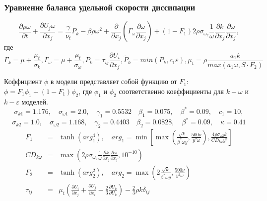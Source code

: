 \documentclass[pdftex,a4paper,12pt]{article}
\begin{document}
		\subsubsection{Уравнение баланса удельной скорости диссипации}
			\begin{equation}
				\frac{\partial \rho \omega}{\partial t} + \frac{\partial U_j \omega}{\partial x_j} = \frac{\gamma}{\nu_t}P_k - \beta\rho\omega^2 + \frac{\partial}{\partial x_j}(\Gamma_{\omega}\frac{\partial \omega}{\partial x_j}) + (1-F_1)2\rho \sigma_{\omega_2}\frac{1}{\omega}\frac{\partial k}{\partial x_j}\frac{\partial \omega}{\partial x_j},
			\end{equation}
			где
			\small{
			\begin{equation}
				\Gamma_k = \mu + \frac{\mu_t}{\sigma_k}, \Gamma_{\omega} = \mu + \frac{\mu_t}{\sigma_{\omega}}, P_k = \tau_{ij}\frac{\partial U_i}{\partial x_j}, \tilde{P}_k = min(P_k, c_1\varepsilon), \mu_t=\rho\frac{a_1 k}{max(a_1\omega, S \cdot F_2)}
			\end{equation}
			}
			
			Коффициент $\phi$ в модели представляет собой функцию от $F_1$: $\phi = F_1\phi_1 + (1-F_1)\phi_2$, где $\phi_1$ и $\phi_2$ соответственно коеффициенты для $k-\omega$ и $k-\varepsilon$ моделей.
			$$
				\sigma_{k1} = 1.176, \quad \sigma_{\omega 1} = 2.0, \quad \gamma_1 = 0.5532 \quad \beta_1=0.075, \quad \beta^*=0.09, \quad c_1 = 10,
			$$
			$$
				\sigma_{k2} = 1.0, \quad \sigma_{\omega 2} = 1.168, \quad \gamma_2 = 0.4403 \quad \beta_2=0.0828, \quad \beta^*=0.09, \quad \kappa = 0.41
			$$
			\begin{eqnarray}
				F_1 &=& \tanh{(arg_1^4)}, \quad arg_1 = \min\left[\max\left(\frac{\sqrt{k}}{\beta^*\omega y},\frac{500 \nu}{y^2 \omega} \right), \frac{4\rho\sigma_{\omega 2}k}{CD_{k\omega}y^2}\right] \\ \nonumber CD_{k\omega} &=& \max\left( 2\rho\sigma_{\omega_2}\frac{1}{\omega}\frac{\partial k}{\partial x_j}\frac{\partial \omega}{\partial x_j},10^{-10} \right) \\
				F_2 &=& \tanh{(arg_2^2)}, \quad arg_2 = \max\left(2\frac{\sqrt{k}}{\beta^*\omega y},\frac{500 \nu}{y^2\omega}\right) \\
				\nonumber \tau_{ij} &=& \mu_t\left( \frac{\partial U_i}{\partial x_j} + \frac{\partial U_j}{\partial x_i} - \frac{2}{3}\frac{\partial U_k}{\partial U_k}\right) - \frac{2}{3}\rho k \delta_{ij}
			\end{eqnarray}
			\newpage
\end{document}
